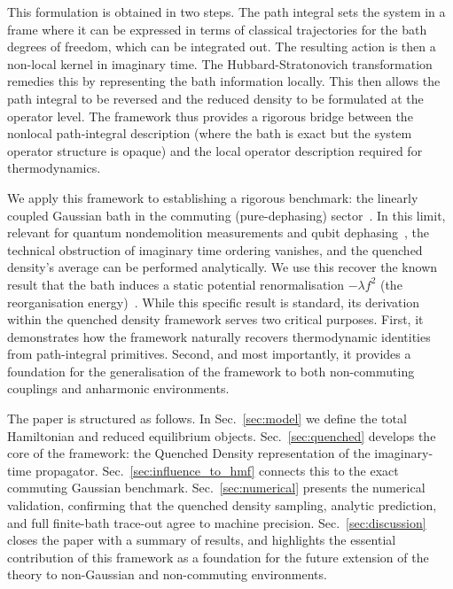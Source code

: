 \documentclass[aps,prl,twocolumn,superscriptaddress,showpacs,floatfix]{revtex4-2}
\begin{document}
This formulation is obtained in two steps. The path integral sets the system in a frame where it can be expressed in terms of classical trajectories for the bath degrees of freedom, which can be integrated out. The resulting action is then a non-local kernel in imaginary time. The Hubbard-Stratonovich transformation remedies this by representing the bath information locally. This then allows the path integral to be reversed and the reduced density to be formulated at the operator level. The framework thus provides a rigorous bridge between the nonlocal path-integral description (where the bath is exact but the system operator structure is opaque) and the local operator description required for thermodynamics.

We apply this framework to establishing a rigorous benchmark: the linearly coupled Gaussian bath in the commuting (pure-dephasing) sector~\cite{clerkIntroductionQuantumNoise2010,breuerTheoryOpenQuantum2002}. In this limit, relevant for quantum nondemolition measurements and qubit dephasing~\cite{makhlinQuantumStateEngineering2001,palmaQuantumComputersDissipation1996}, the technical obstruction of imaginary time ordering vanishes, and the quenched density's average can be performed analytically. We use this recover the known result that the bath induces a static potential renormalisation $-\lambda f^2$ (the reorganisation energy)~\cite{campisiTalknerHanggi2009Solvable}. While this specific result is standard, its derivation within the quenched density framework serves two critical purposes. First, it demonstrates how the framework naturally recovers thermodynamic identities from path-integral primitives. Second, and most importantly, it provides a foundation for the generalisation of the framework to both non-commuting couplings and anharmonic environments.

The paper is structured as follows. In Sec.~\ref{sec:model} we define the total Hamiltonian and reduced equilibrium objects. Sec.~\ref{sec:quenched} develops the core of the framework: the Quenched Density representation of the imaginary-time propagator. Sec.~\ref{sec:influence_to_hmf} connects this to the exact commuting Gaussian benchmark. Sec.~\ref{sec:numerical} presents the numerical validation, confirming that the quenched density sampling, analytic prediction, and full finite-bath trace-out agree to machine precision. Sec.~\ref{sec:discussion} closes the paper with a summary of results, and highlights the essential contribution of this framework as a foundation for the future extension of the theory to non-Gaussian and non-commuting environments.
\end{document}
